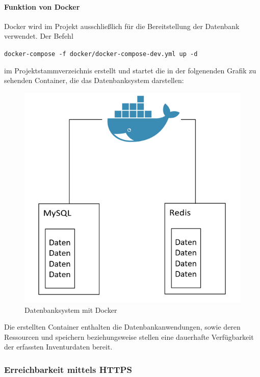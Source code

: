 \documentclass[
]{article}
\begin{document}
\hypertarget{funktion-von-docker}{%
\paragraph{Funktion von Docker}\label{funktion-von-docker}}

Docker wird im Projekt ausschließlich für die Bereitstellung der
Datenbank verwendet. Der Befehl

\texttt{docker-compose\ -f\ docker/docker-compose-dev.yml\ up\ -d}

im Projektstammverzeichnis erstellt und startet die in der folgenenden
Grafik zu sehenden Container, die das Datenbanksystem darstellen:

\begin{figure}[ht]
\centering
\includegraphics{docker.png}
\caption{Datenbanksystem mit Docker}
\end{figure}

Die erstellten Container enthalten die Datenbankanwendungen, sowie deren
Ressourcen und speichern beziehungsweise stellen eine dauerhafte
Verfügbarkeit der erfassten Inventurdaten bereit.

\hypertarget{erreichbarkeit-mittels-https}{%
\subsubsection{Erreichbarkeit mittels
HTTPS}\label{erreichbarkeit-mittels-https}}
\end{document}
